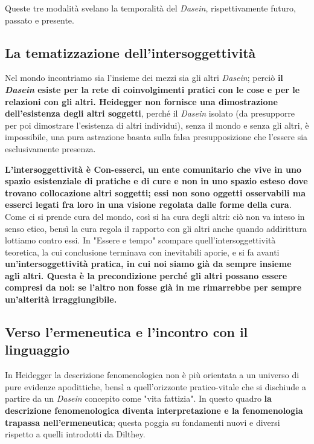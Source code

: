 Queste tre modalità svelano la temporalità del
\textit{Dasein}, rispettivamente futuro, passato e presente.

\subsection{La tematizzazione dell'intersoggettività}

Nel mondo incontriamo sia l'insieme dei mezzi
sia gli altri \textit{Dasein}; perciò \textbf{il \textit{Dasein} esiste per
la rete di coinvolgimenti pratici con le cose e
per le relazioni con gli altri. Heidegger non fornisce una dimostrazione dell'esistenza degli altri soggetti}, perché il \textit{Dasein} isolato (da presupporre per poi dimostrare l'esistenza di altri individui), senza il mondo e senza gli altri, è impossibile, una pura astrazione basata sulla falsa presupposizione che l'essere sia esclusivamente presenza.

\textbf{L'intersoggettività è Con-esserci, un ente comunitario che vive in uno spazio esistenziale di pratiche e di cure e non in uno spazio esteso dove trovano collocazione altri soggetti; essi non sono oggetti osservabili ma esserci legati fra loro in una visione regolata dalle forme della cura}. Come ci si prende cura del mondo, così si ha cura degli altri: ciò non va inteso in senso etico, bensì la cura regola il rapporto con gli altri anche quando addirittura lottiamo contro essi.
In "Essere e tempo" scompare quell'intersoggettività teoretica, la cui conclusione terminava con inevitabili aporie, e si fa avanti \textbf{un'intersoggettività pratica, in cui noi siamo già da sempre insieme agli altri. Questa è la precondizione perché gli altri possano essere compresi da noi: se l'altro non fosse già in me rimarrebbe per sempre un'alterità irraggiungibile.}

\subsection{Verso l'ermeneutica e l'incontro con il linguaggio}

In Heidegger la descrizione fenomenologica non è
più orientata a un universo di pure evidenze
apodittiche, bensì a quell'orizzonte
pratico-vitale che si dischiude a partire da un
\textit{Dasein} concepito come "vita fattizia". In questo
quadro \textbf{la descrizione fenomenologica diventa
interpretazione e la fenomenologia trapassa
nell'ermeneutica}; questa poggia su fondamenti nuovi
e diversi rispetto a quelli introdotti da Dilthey.

